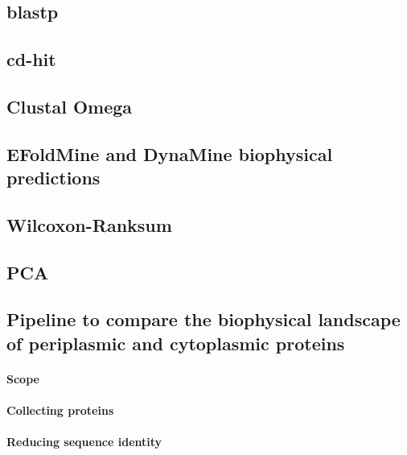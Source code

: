 \documentclass[a4paper]{article}
\begin{document}
	\subsection{blastp}
		
	\subsection{cd-hit}
		
	\subsection{Clustal Omega}
		
	\subsection{EFoldMine and DynaMine biophysical predictions}
		
		
	\subsection{Wilcoxon-Ranksum}
		
	\subsection{PCA}	
		
	\subsection{Pipeline to compare the biophysical landscape of periplasmic and cytoplasmic proteins}
		\paragraph{Scope}
			
		\paragraph{Collecting proteins}
			
		\paragraph{Reducing sequence identity}
			
\end{document}

